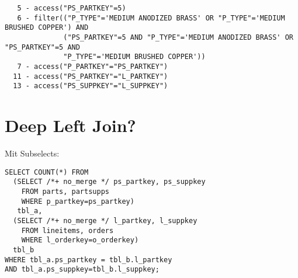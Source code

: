 \documentclass[11pt,a4paper,parskip=half]{scrartcl}
\begin{document}
\begin{lstlisting}
   5 - access("PS_PARTKEY"=5)                                                                                                                                                                                                                                                                                
   6 - filter(("P_TYPE"='MEDIUM ANODIZED BRASS' OR "P_TYPE"='MEDIUM BRUSHED COPPER') AND                                                                                                                                                                                                                     
              ("PS_PARTKEY"=5 AND "P_TYPE"='MEDIUM ANODIZED BRASS' OR "PS_PARTKEY"=5 AND                                                                                                                                                                                                                     
              "P_TYPE"='MEDIUM BRUSHED COPPER'))                                                                                                                                                                                                                                                             
   7 - access("P_PARTKEY"="PS_PARTKEY")                                                                                                                                                                                                                                                                      
  11 - access("PS_PARTKEY"="L_PARTKEY")                                                                                                                                                                                                                                                                      
  13 - access("PS_SUPPKEY"="L_SUPPKEY")                                                                                                                                                                                                                                                                      
\end{lstlisting}

\section{Deep Left Join?}

Mit Subselects:
\begin{lstlisting}
SELECT COUNT(*) FROM
  (SELECT /*+ no_merge */ ps_partkey, ps_suppkey
    FROM parts, partsupps
    WHERE p_partkey=ps_partkey)
   tbl_a,
  (SELECT /*+ no_merge */ l_partkey, l_suppkey
    FROM lineitems, orders
    WHERE l_orderkey=o_orderkey) 
  tbl_b
WHERE tbl_a.ps_partkey = tbl_b.l_partkey
AND tbl_a.ps_suppkey=tbl_b.l_suppkey;
\end{lstlisting}
\end{document}
